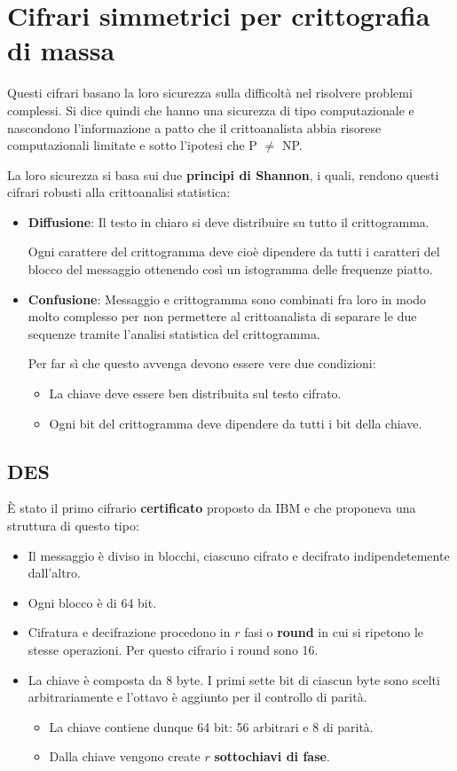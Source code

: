 \chapter{Cifrari simmetrici per crittografia di massa}\label{critto_sim_massa}
Questi cifrari basano la loro sicurezza sulla difficolt\`a nel risolvere problemi complessi. Si dice quindi che hanno
una sicurezza di tipo computazionale e nascondono l'informazione a patto che il crittoanalista abbia risorese
computazionali limitate e sotto l'ipotesi che P $\neq$ NP.

La loro sicurezza si basa sui due \textbf{principi di Shannon}, i quali, rendono questi cifrari robusti alla
crittoanalisi statistica:
\begin{itemize}
	\item \textbf{Diffusione}: Il testo in chiaro si deve distribuire su tutto il crittogramma.

	      Ogni carattere del crittogramma deve cio\`e dipendere da tutti i caratteri del blocco del messaggio ottenendo
	      cos\`i un istogramma delle frequenze piatto.
	\item \textbf{Confusione}: Messaggio e crittogramma sono combinati fra loro in modo molto complesso per non
	      permettere al crittoanalista di separare le due sequenze tramite l'analisi statistica del crittogramma.

	      Per far s\`i che questo avvenga devono essere vere due condizioni:
	      \begin{itemize}
		      \item La chiave deve essere ben distribuita sul testo cifrato.
		      \item Ogni bit del crittogramma deve dipendere da tutti i bit della chiave.
	      \end{itemize}
\end{itemize}

\section{DES}\label{DES}
\`E stato il primo cifrario \textbf{certificato} proposto da IBM e che proponeva una struttura di questo tipo:
\begin{itemize}
	\item Il messaggio \`e diviso in blocchi, ciascuno cifrato e decifrato indipendetemente dall'altro.
	\item Ogni blocco \`e di 64 bit.
	\item Cifratura e decifrazione procedono in $r$ fasi o \textbf{round} in cui si ripetono le stesse operazioni. Per
	      questo cifrario i round sono 16.
	\item La chiave \`e composta da 8 byte. I primi sette bit di ciascun byte sono scelti arbitrariamente e l'ottavo
	      \`e aggiunto per il controllo di parit\`a.
	      \begin{itemize}
		      \item La chiave contiene dunque 64 bit: 56 arbitrari e 8 di parit\`a.
		      \item Dalla chiave vengono create $r$ \textbf{sottochiavi di fase}.
	      \end{itemize}
\end{itemize}

